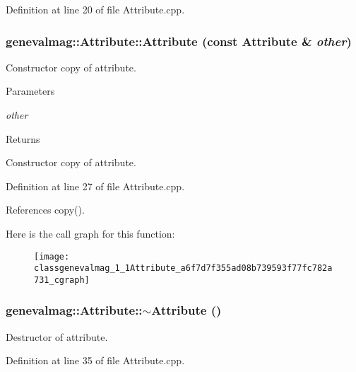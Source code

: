Definition at line 20 of file Attribute.cpp.

\hypertarget{classgenevalmag_1_1Attribute_a6f7d7f355ad08b739593f77fc782a731}{
\subsubsection[{Attribute}]{\setlength{\rightskip}{0pt plus 5cm}genevalmag::Attribute::Attribute (const {\bf Attribute} \& {\em other})}}
\label{classgenevalmag_1_1Attribute_a6f7d7f355ad08b739593f77fc782a731}
Constructor copy of attribute. 
\begin{DoxyParams}{Parameters}
\item[{\em other}]\end{DoxyParams}
\begin{DoxyReturn}{Returns}

\end{DoxyReturn}
Constructor copy of attribute. 

Definition at line 27 of file Attribute.cpp.



References copy().



Here is the call graph for this function:\nopagebreak
\begin{figure}[H]
\begin{center}
\leavevmode
\texttt{[image: classgenevalmag\_1\_1Attribute\_a6f7d7f355ad08b739593f77fc782a731\_cgraph]}
\end{center}
\end{figure}


\hypertarget{classgenevalmag_1_1Attribute_a00058e8a31423fe3d2d2a2127090eba0}{
\subsubsection[{$\sim$Attribute}]{\setlength{\rightskip}{0pt plus 5cm}genevalmag::Attribute::$\sim$Attribute ()}}
\label{classgenevalmag_1_1Attribute_a00058e8a31423fe3d2d2a2127090eba0}
Destructor of attribute. 

Definition at line 35 of file Attribute.cpp.



